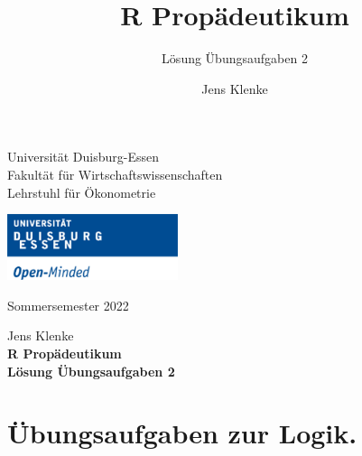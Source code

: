 \documentclass[12pt,a4paper]{article}
\title{R Propädeutikum}
\subtitle{Lösung Übungsaufgaben 2}
\author{Jens Klenke}
\date{}
\begin{document}





\restoregeometry



\begin{minipage}{0.6\textwidth}
Universität Duisburg-Essen\\
Fakultät für Wirtschaftswissenschaften\\
Lehrstuhl für Ökonometrie\\
\end{minipage}

	\begin{flushright}
	\vspace{-3cm}
	\includegraphics*[width=5cm]{includes/duelogo_en.png}\\
	\vspace{.125cm}
	\end{flushright}
\hspace{-0.005cm}Sommersemester 2022

\vspace{0.05cm}

\begin{center}
	\vspace{.25cm}
	Jens Klenke \hspace{.5cm}  \\
	\vspace{.25cm}
	\textbf{\Large{R Propädeutikum}}\\
	\vspace{.25cm}
	\textbf{\large{Lösung Übungsaufgaben 2}}\\
	\vspace{.125cm}
\end{center}





\hypertarget{uxfcbungsaufgaben-zur-logik.}{%
\section{Übungsaufgaben zur Logik.}\label{uxfcbungsaufgaben-zur-logik.}}
\end{document}

